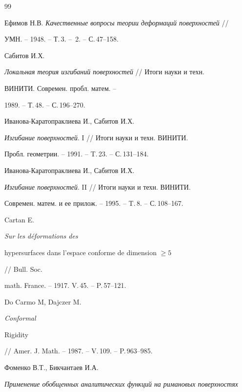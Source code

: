 \begin{thebibliography}{99}







Ефимов Н.В. {\em Качественные вопросы теории деформаций поверхностей} //


УМН. -- 1948. -- Т.\,3. -- \No\,2. -- С.\,47--158.





 Сабитов И.Х.


{\em Локальная теория изгибаний поверхностей} // Итоги науки и техн.


ВИНИТИ. Современ. пробл. матем. -- 


1989. -- Т.\,48. -- С.\,196--270.





 Иванова-Каратопраклиева И., Сабитов И.Х.


{\em Изгибание поверхностей}. I // Итоги науки и техн. ВИНИТИ. 


Пробл. геометрии. -- 1991. -- T.\,23. -- С.\,131--184.





 Иванова-Каратопраклиева И., Сабитов И.Х.


{\em Изгибание поверхностей}. II // Итоги науки и техн. ВИНИТИ. 


Современ. матем. и ее прилож. -- 1995. -- T.\,8. -- С.\,108--167.





 Cartan E. {\em Sur les d\'eformations des


hypersurfaces dans l'espace conforme de dimension $\ge5$} // Bull. Soc.


math. France. -- 1917. V.\,45. -- P.\,57--121.





 Do Carmo M, Dajczer M. {\em Conformal


Rigidity} // Amer. J. Math. -- 1987. -- V.\,109. -- P.\,963--985.





 Фоменко В.Т., Бикчантаев И.А.


{\em Применение обобщенных аналитических функций на римановых поверхностях


}
\end{thebibliography}
